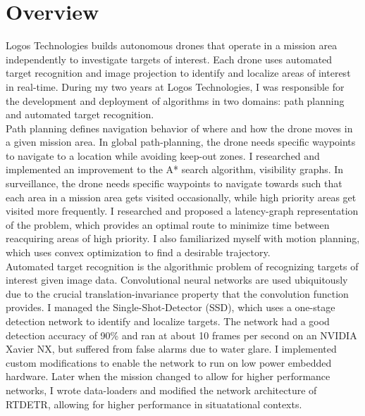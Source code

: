 \section{Overview}
Logos Technologies builds autonomous drones that operate in a mission area independently to investigate targets of interest. Each drone uses automated target recognition and image projection to identify and localize areas of interest in real-time. During my two years at Logos Technologies, I was responsible for the development and deployment of algorithms in two domains: path planning and automated target recognition.\\

Path planning defines navigation behavior of where and how the drone moves in a given mission area. In global path-planning, the drone needs specific waypoints to navigate to a location while avoiding keep-out zones. I researched and implemented an improvement to the A* search algorithm, visibility graphs. In surveillance, the drone needs specific waypoints to navigate towards such that each area in a mission area gets visited occasionally, while high priority areas get visited more frequently. I researched and proposed a latency-graph representation of the problem, which provides an optimal route to minimize time between reacquiring areas of high priority. I also familiarized myself with motion planning, which uses convex optimization to find a desirable trajectory.\\

Automated target recognition is the algorithmic problem of recognizing targets of interest given image data. Convolutional neural networks are used ubiquitously due to the crucial translation-invariance property that the convolution function provides. I managed the Single-Shot-Detector (SSD), which uses a one-stage detection network to identify and localize targets. The network had a good detection accuracy of 90\% and ran at about 10 frames per second on an NVIDIA Xavier NX, but suffered from false alarms due to water glare. I implemented custom modifications to enable the network to run on low power embedded hardware. Later when the mission changed to allow for higher performance networks, I wrote data-loaders and modified the network architecture of RTDETR, allowing for higher performance in situatational contexts.\\